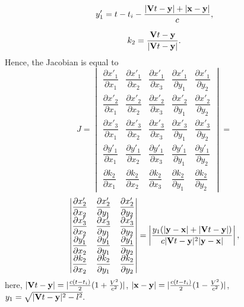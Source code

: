 \documentclass{procDDs}
\begin{document}
\begin{equation}
	\label{form_y}
	y_1' = t-t_i - \frac{|\mathbf{V}t-\mathbf{y}|+|\mathbf{x}-\mathbf{y}|}{c},
\end{equation}

\begin{equation}
	\label{form_k_2}
	k_2 = \frac{\mathbf{V}t - \mathbf{y}}{|\mathbf{V}t - \mathbf{y}|}.
\end{equation}
Hence, the Jacobian is equal to
\begin{equation*}
J = \begin{vmatrix}
	\dfrac{\partial x'_1}{\partial x_1} & \dfrac{\partial x'_1}{\partial x_2} & \dfrac{\partial x'_1}{\partial x_3} & \dfrac{\partial x'_1}{\partial y_1} & \dfrac{\partial x'_1}{\partial y_2}\\
	\dfrac{\partial x'_2}{\partial x_ 1} & \dfrac{\partial x'_2}{\partial x_2} & \dfrac{\partial x'_2}{\partial x_3} & \dfrac{\partial x'_2}{\partial y_1} & \dfrac{\partial x'_2}{\partial y_2}\\
	\dfrac{\partial x'_3}{\partial x_1} & \dfrac{\partial x'_3}{\partial x_2} & \dfrac{\partial x'_3}{\partial x_3} & \dfrac{\partial x'_3}{\partial y_1} & \dfrac{\partial x'_3}{\partial y_2}\\
	\dfrac{\partial y'_1}{\partial x_1} & \dfrac{\partial y'_1}{\partial x_2} & \dfrac{\partial y'_1}{\partial x_3} & \dfrac{\partial y'_1}{\partial y_1} & \dfrac{\partial y'_1}{\partial y_2}\\
	\dfrac{\partial k_2}{\partial x_1} & \dfrac{\partial k_2}{\partial x_2} & \dfrac{\partial k_2}{\partial x_3} & \dfrac{\partial k_2}{\partial y_1} & \dfrac{\partial k_2}{\partial y_2}
\end{vmatrix} = 
\end{equation*}
\begin{equation*}
\begin{vmatrix}
	\dfrac{\partial x'_2}{\partial x_2} & \dfrac{\partial x'_2}{\partial y_1} & \dfrac{\partial x'_2}{\partial y_2}\\
	\dfrac{\partial x'_3}{\partial x_2} & \dfrac{\partial x'_3}{\partial y_1} & \dfrac{\partial x'_3}{\partial y_2}\\
	\dfrac{\partial y'_1}{\partial x_2} & \dfrac{\partial y'_1}{\partial y_1} & \dfrac{\partial y'_1}{\partial y_2}\\
	\dfrac{\partial k_2}{\partial x_2} & \dfrac{\partial k_2}{\partial y_1} & \dfrac{\partial k_2}{\partial y_2}
\end{vmatrix} = \left| \frac{y_1(|\mathbf{y}-\mathbf{x}|+|\mathbf{V}t-\mathbf{y}|)}{c|\mathbf{V}t-\mathbf{y}|^2|\mathbf{y}-\mathbf{x}|} \right|,	 
\end{equation*}
here, $|\mathbf{V}t - \mathbf{y}| = |\frac{c(t-t_i)}{2}(1+\frac{V^2}{c^2})|$, $|\mathbf{x}-\mathbf{y}| = |\frac{c(t-t_i)}{2}(1-\frac{V^2}{c^2})|$, $y_1 = \sqrt{|\mathbf{V}t-\mathbf{y}|^2 - l^2}.$
\end{document}
